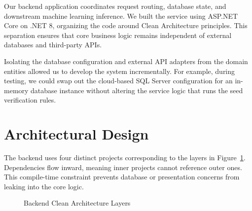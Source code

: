 Our backend application coordinates request routing, database state, and downstream machine learning inference. We built the service using ASP.NET Core on .NET 8, organizing the code around Clean Architecture principles. This separation ensures that core business logic remains independent of external databases and third-party APIs.

Isolating the database configuration and external API adapters from the domain entities allowed us to develop the system incrementally. For example, during testing, we could swap out the cloud-based SQL Server configuration for an in-memory database instance without altering the service logic that runs the seed verification rules.

\section{Architectural Design}
\label{sec:backend-architecture}

The backend uses four distinct projects corresponding to the layers in Figure~\ref{fig:backend-clean-architecture}. Dependencies flow inward, meaning inner projects cannot reference outer ones. This compile-time constraint prevents database or presentation concerns from leaking into the core logic.

\begin{figure}[H]
\centering
{}
\caption{Backend Clean Architecture Layers}
\label{fig:backend-clean-architecture}
\end{figure}

